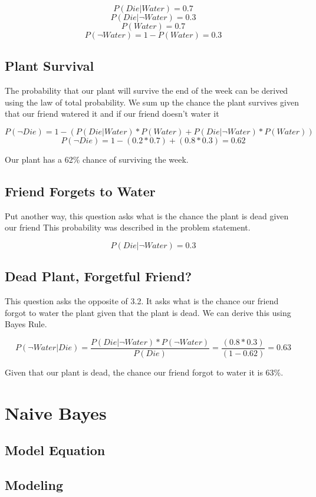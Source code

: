\documentclass{article}
\begin{document}
\[P(Die | Water) = 0.7\]
\[P(Die | \neg Water) = 0.3\]
\[P(Water) = 0.7\]
\[P(\neg Water) = 1 - P(Water) = 0.3\]

\subsection{Plant Survival}
The probability that our plant will survive the end of the week can be derived using the law of total probability. We sum up the chance the plant survives given that our friend watered it and if our friend doesn't water it

\[P(\neg Die) = 1 - ( P(Die | Water) * P(Water) + P(Die | \neg Water) * P(Water) ) \]
\[P(\neg Die) = 1 - (0.2*0.7) + (0.8*0.3) = 0.62 \]

\vspace{10mm}
\noindent
Our plant has a 62\% chance of surviving the week.

\subsection{Friend Forgets to Water}
Put another way, this question asks what is the chance the plant is dead given our friend  This probability was described in the problem statement.

\[P(Die | \neg Water) = 0.3\]

\subsection{Dead Plant, Forgetful Friend?}
This question asks the opposite of 3.2. It asks what is the chance our friend forgot to water the plant given that the plant is dead. We can derive this using Bayes Rule.

\[P(\neg Water | Die) = \frac{P(Die | \neg Water) * P(\neg Water)}{P(Die)} = \frac{(0.8*0.3)}{(1-0.62)} = 0.63\]

Given that our plant is dead, the chance our friend forgot to water it is 63\%.

\section{Naive Bayes}

\subsection{Model Equation}
\subsection{Modeling}
\end{document}
